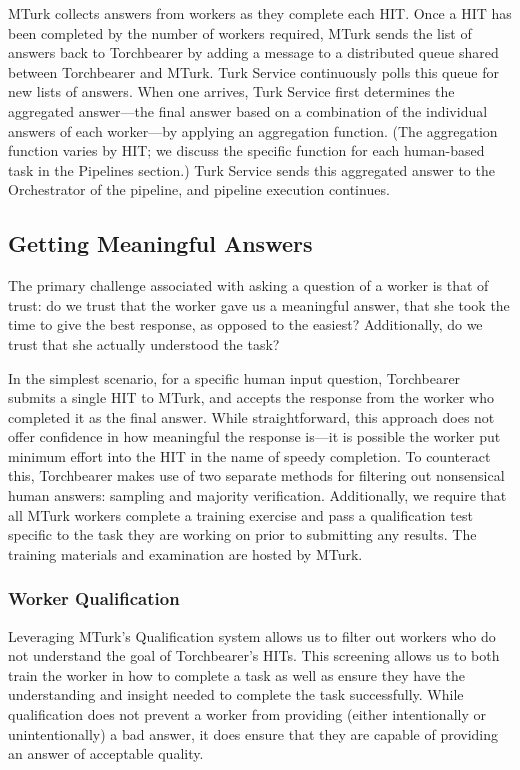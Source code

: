 MTurk collects answers from workers as they complete each HIT. Once a HIT has been completed by the number of workers required, MTurk sends the list of answers back to Torchbearer by adding a message to a distributed queue shared between Torchbearer and MTurk. Turk Service continuously polls this queue for new lists of answers. When one arrives, Turk Service first determines the aggregated answer---the final answer based on a combination of the individual answers of each worker---by applying an aggregation function. (The aggregation function varies by HIT; we discuss the specific function for each human-based task in the Pipelines section.) Turk Service sends this aggregated answer to the Orchestrator of the pipeline, and pipeline execution continues.

\subsection{Getting Meaningful Answers}

The primary challenge associated with asking a question of a worker is that of trust: do we trust that the worker gave us a meaningful answer, that she took the time to give the best response, as opposed to the easiest? Additionally, do we trust that she actually understood the task? 

In the simplest scenario, for a specific human input question, Torchbearer submits a single HIT to MTurk, and accepts the response from the worker who completed it as the final answer. While straightforward, this approach does not offer confidence in how meaningful the response is---it is possible the worker put minimum effort into the HIT in the name of speedy completion. To counteract this, Torchbearer makes use of two separate methods for filtering out nonsensical human answers: sampling and majority verification. Additionally, we require that all MTurk workers complete a training exercise and pass a qualification test specific to the task they are working on prior to submitting any results. The training materials and examination are hosted by MTurk.

\subsubsection{Worker Qualification}\label{workerqual}

Leveraging MTurk's Qualification system allows us to filter out workers who do not understand the goal of Torchbearer's HITs. This screening allows us to both train the worker in how to complete a task as well as ensure they have the understanding and insight needed to complete the task successfully. While qualification does not prevent a worker from providing (either intentionally or unintentionally) a bad answer, it does ensure that they are capable of providing an answer of acceptable quality.

